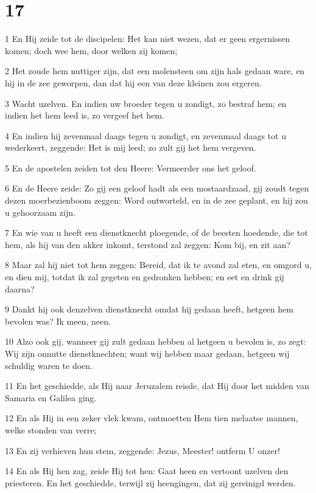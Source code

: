 \chapter{17}

\par 1 En Hij zeide tot de discipelen: Het kan niet wezen, dat er geen ergernissen komen; doch wee hem, door welken zij komen;
\par 2 Het zoude hem nuttiger zijn, dat een molensteen om zijn hals gedaan ware, en hij in de zee geworpen, dan dat hij een van deze kleinen zou ergeren.
\par 3 Wacht uzelven. En indien uw broeder tegen u zondigt, zo bestraf hem; en indien het hem leed is, zo vergeef het hem.
\par 4 En indien hij zevenmaal daags tegen u zondigt, en zevenmaal daags tot u wederkeert, zeggende: Het is mij leed; zo zult gij het hem vergeven.
\par 5 En de apostelen zeiden tot den Heere: Vermeerder ons het geloof.
\par 6 En de Heere zeide: Zo gij een geloof hadt als een mostaardzaad, gij zoudt tegen dezen moerbezienboom zeggen: Word ontworteld, en in de zee geplant, en hij zou u gehoorzaam zijn.
\par 7 En wie van u heeft een dienstknecht ploegende, of de beesten hoedende, die tot hem, als hij van den akker inkomt, terstond zal zeggen: Kom bij, en zit aan?
\par 8 Maar zal hij niet tot hem zeggen: Bereid, dat ik te avond zal eten, en omgord u, en dien mij, totdat ik zal gegeten en gedronken hebben; en eet en drink gij daarna?
\par 9 Dankt hij ook denzelven dienstknecht omdat hij gedaan heeft, hetgeen hem bevolen was? Ik meen, neen.
\par 10 Alzo ook gij, wanneer gij zult gedaan hebben al hetgeen u bevolen is, zo zegt: Wij zijn onnutte dienstknechten; want wij hebben maar gedaan, hetgeen wij schuldig waren te doen.
\par 11 En het geschiedde, als Hij naar Jeruzalem reisde, dat Hij door het midden van Samaria en Galilea ging.
\par 12 En als Hij in een zeker vlek kwam, ontmoetten Hem tien melaatse mannen, welke stonden van verre;
\par 13 En zij verhieven hun stem, zeggende: Jezus, Meester! ontferm U onzer!
\par 14 En als Hij hen zag, zeide Hij tot hen: Gaat heen en vertoont uzelven den priesteren. En het geschiedde, terwijl zij heengingen, dat zij gereinigd werden.
